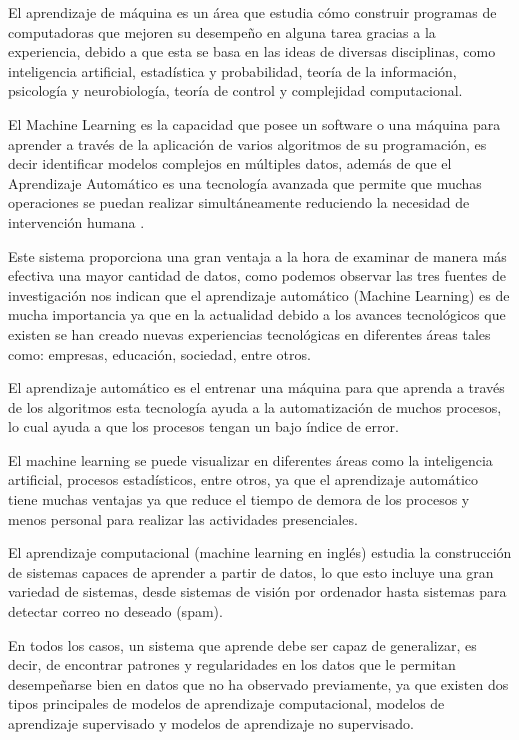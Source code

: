 El aprendizaje de máquina es un área que estudia cómo construir programas de computadoras que mejoren su desempeño en alguna tarea gracias a la experiencia, debido a que esta se basa en las ideas de diversas disciplinas, como inteligencia artificial, estadística y probabilidad, teoría de la información, psicología y neurobiología, teoría de control y complejidad computacional.

El Machine Learning es la capacidad que posee un software o una máquina para aprender a través de la aplicación de varios algoritmos de su programación, es decir identificar modelos complejos en múltiples datos, además de que el Aprendizaje Automático es una tecnología avanzada que permite que muchas operaciones se puedan realizar simultáneamente reduciendo la necesidad de intervención humana \cite{CornejoMacias2021}.

Este sistema proporciona una gran ventaja a la hora de examinar de manera más efectiva una mayor cantidad de datos, como podemos observar las tres fuentes de investigación nos indican que el aprendizaje automático (Machine Learning) es de mucha importancia ya que en la actualidad debido a los avances tecnológicos que existen se han creado nuevas experiencias tecnológicas en diferentes áreas tales como: empresas, educación, sociedad, entre otros.

El aprendizaje automático es el entrenar una máquina para que aprenda a través de los algoritmos esta tecnología ayuda a la automatización de muchos procesos, lo cual ayuda a que los procesos tengan un bajo índice de error.

El machine learning se puede visualizar en diferentes áreas como la inteligencia artificial, procesos estadísticos, entre otros, ya que el aprendizaje automático tiene muchas ventajas ya que reduce el tiempo de demora de los procesos y menos personal para realizar las actividades presenciales.

El aprendizaje computacional (machine learning en inglés) estudia la construcción de sistemas capaces de aprender a partir de datos, lo que esto incluye una gran variedad de sistemas, desde sistemas de visión por ordenador hasta sistemas para detectar correo no deseado (spam).

En todos los casos, un sistema que aprende debe ser capaz de generalizar, es decir, de encontrar patrones y regularidades en los datos que le permitan desempeñarse bien en datos que no ha observado previamente, ya que existen dos tipos principales de modelos de aprendizaje computacional, modelos de aprendizaje supervisado y modelos de aprendizaje no supervisado.

